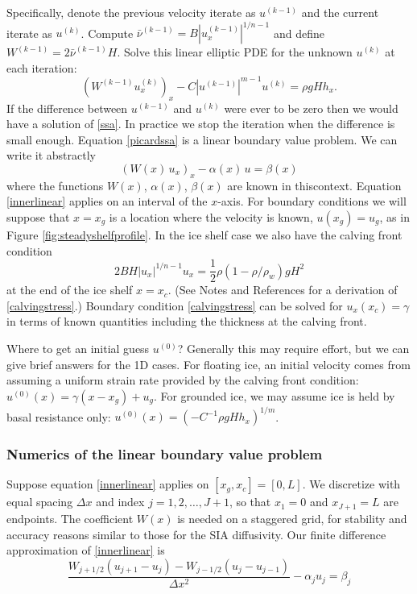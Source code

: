 \documentclass[letterpaper,final,12pt,reqno]{amsart}
\begin{document}
Specifically, denote the previous velocity iterate as $u^{(k-1)}$ and the current iterate as $u^{(k)}$.  Compute $\bar \nu^{(k-1)} = B |u^{(k-1)}_x|^{1/n-1}$ and define $W^{(k-1)} = 2 \bar \nu^{(k-1)} H$.  Solve this linear elliptic PDE for the unknown $u^{(k)}$ at each iteration:
\begin{equation}
   \left(W^{(k-1)} u^{(k)}_x\right)_x - C |u^{(k-1)}|^{m-1} u^{(k)} = \rho g H h_x. \label{picardssa}
\end{equation}
If the difference between $u^{(k-1)}$ and $u^{(k)}$ were ever to be zero then we would have a solution of \eqref{ssa}.  In practice we stop the iteration when the difference is small enough.  Equation \eqref{picardssa} is a linear boundary value problem.  We can write it abstractly
\begin{equation}
  \left(W(x)\, u_x\right)_x - \alpha(x)\, u = \beta(x)  \label{innerlinear}
\end{equation}
where the functions $W(x)$, $\alpha(x)$, $\beta(x)$ are known in thiscontext.  Equation \eqref{innerlinear} applies on an interval of the $x$-axis.  For boundary conditions we will suppose that $x=x_g$ is a location where the velocity is known, $u(x_g)=u_g$, as in Figure \ref{fig:steadyshelfprofile}.  In the ice shelf case we also have the calving front condition
\begin{equation}
  2 B H |u_x|^{1/n - 1} u_x = \frac{1}{2}\rho (1-\rho/\rho_w) g H^2  \label{calvingstress}
\end{equation}
at the end of the ice shelf $x=x_c$.  (See Notes and References for a derivation of \eqref{calvingstress}.)  Boundary condition \eqref{calvingstress} can be solved for $u_x(x_c)=\gamma$ in terms of known quantities including the thickness at the calving front.

Where to get an initial guess $u^{(0)}$?  Generally this may require effort, but we can give brief answers for the 1D cases.  For floating ice, an initial velocity comes from assuming a uniform strain rate provided by the calving front condition: $u^{(0)}(x) = \gamma (x-x_g) + u_g$.  For grounded ice, we may assume ice is held by basal resistance only: $u^{(0)}(x) = \left(-C^{-1} \rho g H h_x\right)^{1/m}$.

\subsubsection*{Numerics of the linear boundary value problem}  Suppose equation \eqref{innerlinear} applies on $[x_g,x_c]=[0,L]$.  We discretize with equal spacing $\Delta x$ and index $j=1,2,\dots,J+1$, so that $x_1 = 0$ and $x_{J+1} = L$ are endpoints.  The coefficient $W(x)$ is needed on a staggered grid, for stability and accuracy reasons similar to those for the SIA diffusivity.  Our finite difference approximation of \eqref{innerlinear} is
\begin{equation}
  \frac{W_{j+1/2} (u_{j+1} - u_j) - W_{j-1/2} (u_{j} - u_{j-1})}{\Delta x^2} - \alpha_j u_j = \beta_j  \label{discreteinnerlinear}
\end{equation}
\end{document}
